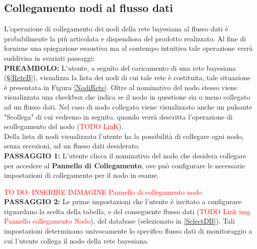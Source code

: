\subsection{Collegamento nodi al flusso dati}\label{Collegamento}

L'operazione di collegamento dei nodi della rete bayesiana al flusso dati è probabilmente la più articolata e dispendiosa del prodotto realizzato. Al fine di fornirne una spiegazione esaustiva ma al contempo intuitiva tale operazione verrà suddivisa in svariati passaggi:
~\\

\textbf{PREAMBOLO:} L'utente, a seguito del caricamento di una rete bayesiana (§\ref{ReteB}), visualizza la lista dei nodi di cui tale rete è costituita, tale situazione è presentata in Figura \ref{NodiRete}. Oltre al nominativo del nodo stesso viene visualizzata una checkbox che indica se il nodo in questione sia o meno collegato ad un flusso dati. Nel caso di nodo collegato viene visualizzato anche un pulsante "Scollega" di cui vedremo in seguito, quando verrà descritta l'operazione di scollegamento del nodo (\textcolor{red}{TODO LinK}).\\
Della lista di nodi visualizzata l'utente ha la possibilità di collegare ogni nodo, senza eccezioni, ad un flusso dati desiderato.
~\\

\textbf{PASSAGGIO 1:} L'utente clicca il nominativo del nodo che desidera collegare per accedere al \textbf{Pannello di Collegamento}, ove può configurare le necessarie impostazioni di collegamento per il nodo in esame.

\textcolor{red}{TO DO: INSERIRE IMMAGINE Pannello di collegamento nodo}
~\\

\textbf{PASSAGGIO 2:} Le prime impostazioni che l'utente è invitato a configurare riguardano la scelta della tabella, e del conseguente flusso dati (\textcolor{red}{TODO Link img Pannello collegamento Nodo}), del database (selezionato in \ref{SelectDB}). Tali impostazioni determinano univocamente lo specifico flusso dati di monitoraggio a cui l'utente collega il nodo della rete bayesiana.
~\\

